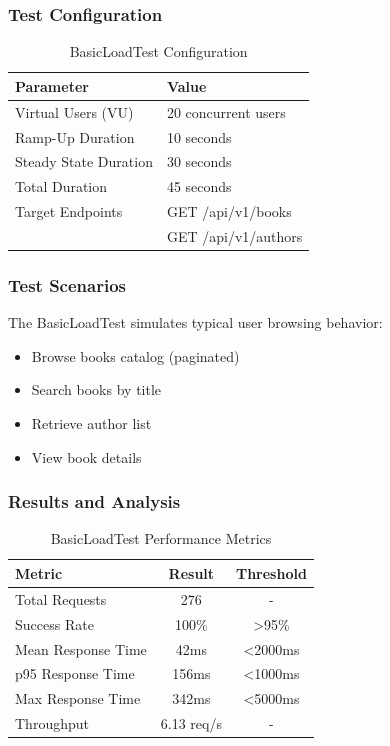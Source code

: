 \subsubsection{Test Configuration}
\begin{table}[H]
    \centering
    \caption{BasicLoadTest Configuration}
    \label{tab:basic_load_config}
    \begin{tabular}{@{}ll@{}}
        \toprule
        \textbf{Parameter} & \textbf{Value} \\ \midrule
        Virtual Users (VU) & 20 concurrent users \\
        Ramp-Up Duration & 10 seconds \\
        Steady State Duration & 30 seconds \\
        Total Duration & 45 seconds \\
        Target Endpoints & GET /api/v1/books \\
         & GET /api/v1/authors \\
        \bottomrule
    \end{tabular}
\end{table}

\subsubsection{Test Scenarios}
The BasicLoadTest simulates typical user browsing behavior:
\begin{itemize}
    \item Browse books catalog (paginated)
    \item Search books by title
    \item Retrieve author list
    \item View book details
\end{itemize}

\subsubsection{Results and Analysis}
\begin{table}[H]
    \centering
    \caption{BasicLoadTest Performance Metrics}
    \label{tab:basic_load_results}
    \begin{tabular}{@{}lcc@{}}
        \toprule
        \textbf{Metric} & \textbf{Result} & \textbf{Threshold} \\ \midrule
        Total Requests & 276 & - \\
        Success Rate & 100\% & \textgreater95\% \\
        Mean Response Time & 42ms & \textless2000ms \\
        p95 Response Time & 156ms & \textless1000ms \\
        Max Response Time & 342ms & \textless5000ms \\
        Throughput & 6.13 req/s & - \\
        \bottomrule
    \end{tabular}
\end{table}

